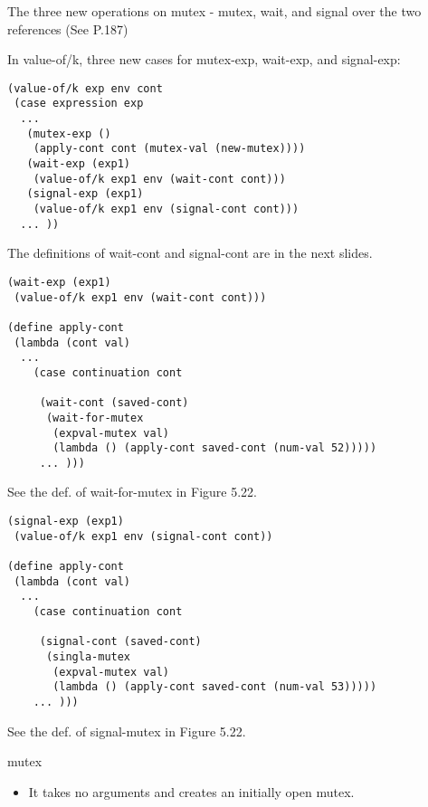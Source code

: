 \documentclass{article}
\begin{document}
\begin{huge}
The three new operations on mutex \al
- mutex, wait, and signal over the two references (See P.187)


In value-of/k, three new cases for mutex-exp, wait-exp, and signal-exp:
\begin{lstlisting}
(value-of/k exp env cont
 (case expression exp 
  ...
   (mutex-exp ()
    (apply-cont cont (mutex-val (new-mutex))))
   (wait-exp (exp1)
    (value-of/k exp1 env (wait-cont cont)))
   (signal-exp (exp1)
    (value-of/k exp1 env (signal-cont cont)))
  ... ))
\end{lstlisting}

The definitions of wait-cont and signal-cont are in the next slides.


\begin{lstlisting}
(wait-exp (exp1)
 (value-of/k exp1 env (wait-cont cont)))

(define apply-cont
 (lambda (cont val)
  ...
    (case continuation cont
    
     (wait-cont (saved-cont)
      (wait-for-mutex
       (expval-mutex val)
       (lambda () (apply-cont saved-cont (num-val 52)))))
     ... )))
 \end{lstlisting}
 
 See the def. of wait-for-mutex in Figure 5.22.
   
\begin{lstlisting}
(signal-exp (exp1)
 (value-of/k exp1 env (signal-cont cont))

(define apply-cont
 (lambda (cont val)
  ...
    (case continuation cont
    
     (signal-cont (saved-cont)
      (singla-mutex
       (expval-mutex val)
       (lambda () (apply-cont saved-cont (num-val 53)))))
    ... )))
\end{lstlisting}
 
 See the def. of signal-mutex in Figure 5.22.
 
 
mutex
\begin{itemize}
\item It takes no arguments and creates an initially open mutex.
\end{itemize}


\end{huge}
\end{document}
